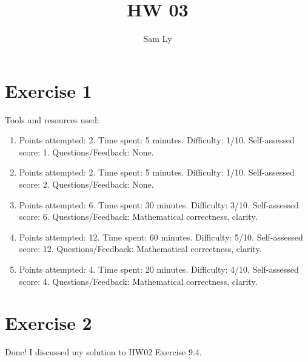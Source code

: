 \documentclass{article}
\title{HW 03}
\author{Sam Ly}
\begin{document}
\maketitle

\section*{Exercise 1}
\noindent
Tools and resources used: 

\begin{enumerate}
  \item[Exercise 1]
    {\color{red} Points attempted: 2}.
    {\color{blue} Time spent: 5 minutes}.
    {\color{brown} Difficulty: 1/10}.
    {\color{green!50!black} Self-assessed score: 1}.
    {\color{magenta} Questions/Feedback: None.}
  \item[Exercise 2]
    {\color{red} Points attempted: 2}.
    {\color{blue} Time spent: 5 minutes}.
    {\color{brown} Difficulty: 1/10}.
    {\color{green!50!black} Self-assessed score: 2}.
    {\color{magenta} Questions/Feedback: None.}
  \item[Exercise 3]
    {\color{red} Points attempted: 6}.
    {\color{blue} Time spent: 30 minutes}.
    {\color{brown} Difficulty: 3/10}.
    {\color{green!50!black} Self-assessed score: 6}.
    {\color{magenta} Questions/Feedback: Mathematical correctness, clarity.}
  \item[Choice Exercise 6]
    {\color{red} Points attempted: 12}.
    {\color{blue} Time spent: 60 minutes}.
    {\color{brown} Difficulty: 5/10}.
    {\color{green!50!black} Self-assessed score: 12}.
    {\color{magenta} Questions/Feedback: Mathematical correctness, clarity.}
  \item[Choice Exercise 8]
    {\color{red} Points attempted: 4}.
    {\color{blue} Time spent: 20 minutes}.
    {\color{brown} Difficulty: 4/10}.
    {\color{green!50!black} Self-assessed score: 4}.
    {\color{magenta} Questions/Feedback: Mathematical correctness, clarity.}
\end{enumerate}
\pagebreak 

\section*{Exercise 2}
Done! I discussed my solution to HW02 Exercise 9.4.
\pagebreak
\end{document}
